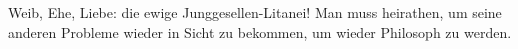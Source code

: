 Weib, Ehe, Liebe: die ewige Junggesellen-Litanei! Man muss heirathen, um seine anderen Probleme wieder in Sicht zu bekommen, um wieder Philosoph zu werden.
\par

